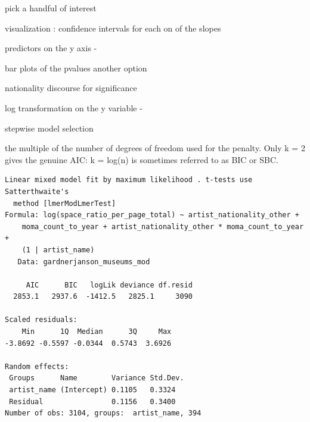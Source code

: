 \documentclass[
  letterpaper,
  DIV=11,
  numbers=noendperiod]{scrreprt}
\begin{document}
pick a handful of interest

visualization : confidence intervals for each on of the slopes

predictors on the y axis -

bar plots of the pvalues another option

nationality discourse for significance

log transformation on the y variable -

stepwise model selection

the multiple of the number of degrees of freedom used for the penalty.
Only k = 2 gives the genuine AIC: k = log(n) is sometimes referred to as
BIC or SBC.

\begin{verbatim}
Linear mixed model fit by maximum likelihood . t-tests use Satterthwaite's
  method [lmerModLmerTest]
Formula: log(space_ratio_per_page_total) ~ artist_nationality_other +  
    moma_count_to_year + artist_nationality_other * moma_count_to_year +  
    (1 | artist_name)
   Data: gardnerjanson_museums_mod

     AIC      BIC   logLik deviance df.resid 
  2853.1   2937.6  -1412.5   2825.1     3090 

Scaled residuals: 
    Min      1Q  Median      3Q     Max 
-3.8692 -0.5597 -0.0344  0.5743  3.6926 

Random effects:
 Groups      Name        Variance Std.Dev.
 artist_name (Intercept) 0.1105   0.3324  
 Residual                0.1156   0.3400  
Number of obs: 3104, groups:  artist_name, 394


\end{verbatim}
\end{document}
